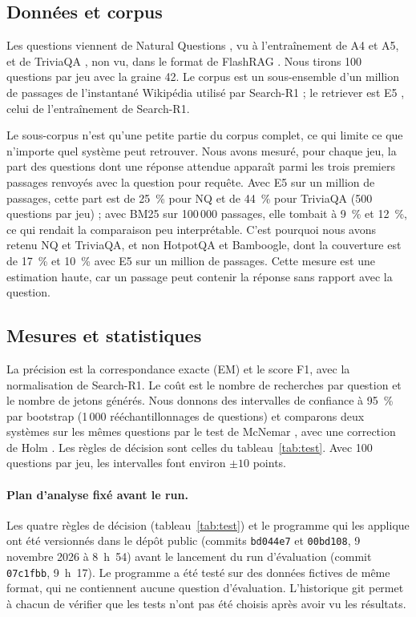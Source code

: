 \documentclass[11pt,a4paper]{article}
\begin{document}
\subsection{Données et corpus}
Les questions viennent de Natural Questions \citep{kwiatkowski2019natural}, vu à l'entraînement de A4 et A5, et de TriviaQA \citep{joshi2017triviaqa}, non vu, dans le format de FlashRAG \citep{jin2024flashrag}. Nous tirons 100 questions par jeu avec la graine 42. Le corpus est un sous-ensemble d'un million de passages de l'instantané Wikipédia utilisé par Search-R1 ; le retriever est E5 \citep{wang2022text}, celui de l'entraînement de Search-R1.

Le sous-corpus n'est qu'une petite partie du corpus complet, ce qui limite ce que n'importe quel système peut retrouver. Nous avons mesuré, pour chaque jeu, la part des questions dont une réponse attendue apparaît parmi les trois premiers passages renvoyés avec la question pour requête. Avec E5 sur un million de passages, cette part est de 25~\% pour NQ et de 44~\% pour TriviaQA (500 questions par jeu) ; avec BM25 \citep{robertson2009probabilistic} sur 100\,000 passages, elle tombait à 9~\% et 12~\%, ce qui rendait la comparaison peu interprétable. C'est pourquoi nous avons retenu NQ et TriviaQA, et non HotpotQA et Bamboogle, dont la couverture est de 17~\% et 10~\% avec E5 sur un million de passages. Cette mesure est une estimation haute, car un passage peut contenir la réponse sans rapport avec la question.

\subsection{Mesures et statistiques}
La précision est la correspondance exacte (EM) et le score F1, avec la normalisation de Search-R1. Le coût est le nombre de recherches par question et le nombre de jetons générés. Nous donnons des intervalles de confiance à 95~\% par bootstrap \citep{efron1979bootstrap} (1\,000 rééchantillonnages de questions) et comparons deux systèmes sur les mêmes questions par le test de McNemar \citep{mcnemar1947note}, avec une correction de Holm \citep{holm1979simple}. Les règles de décision sont celles du tableau~\ref{tab:test}. Avec 100 questions par jeu, les intervalles font environ $\pm 10$ points.

\paragraph{Plan d'analyse fixé avant le run.} Les quatre règles de décision (tableau~\ref{tab:test}) et le programme qui les applique ont été versionnés dans le dépôt public (commits \texttt{bd044e7} et \texttt{00bd108}, 9 novembre 2026 à 8~h~54) avant le lancement du run d'évaluation (commit \texttt{07c1fbb}, 9~h~17). Le programme a été testé sur des données fictives de même format, qui ne contiennent aucune question d'évaluation. L'historique git permet à chacun de vérifier que les tests n'ont pas été choisis après avoir vu les résultats.
\end{document}
